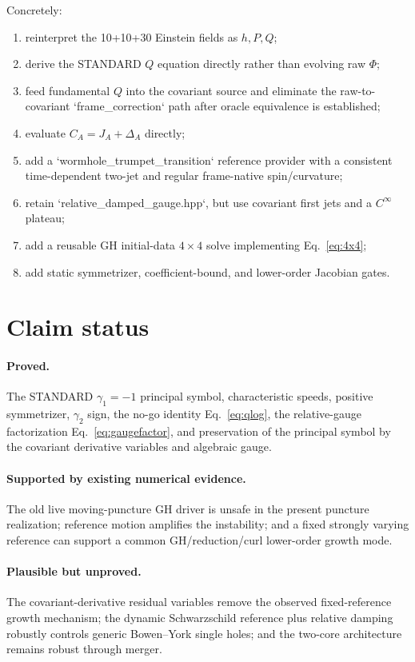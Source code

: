 \documentclass[11pt]{article}
\begin{document}
Concretely:
\begin{enumerate}
\item reinterpret the 10+10+30 Einstein fields as $h,P,Q$;
\item derive the STANDARD $Q$ equation directly rather than evolving raw $\Phi$;
\item feed fundamental $Q$ into the covariant source and eliminate the raw-to-covariant `frame_correction` path after oracle equivalence is established;
\item evaluate $C_A=J_A+\Delta_A$ directly;
\item add a `wormhole_trumpet_transition` reference provider with a consistent time-dependent two-jet and regular frame-native spin/curvature;
\item retain `relative_damped_gauge.hpp`, but use covariant first jets and a $C^\infty$ plateau;
\item add a reusable GH initial-data $4\times4$ solve implementing Eq.~\eqref{eq:4x4};
\item add static symmetrizer, coefficient-bound, and lower-order Jacobian gates.
\end{enumerate}

\section{Claim status}
\paragraph{Proved.}
The STANDARD $\gamma_1=-1$ principal symbol, characteristic speeds, positive symmetrizer, $\gamma_2$ sign, the no-go identity Eq.~\eqref{eq:qlog}, the relative-gauge factorization Eq.~\eqref{eq:gaugefactor}, and preservation of the principal symbol by the covariant derivative variables and algebraic gauge.

\paragraph{Supported by existing numerical evidence.}
The old live moving-puncture GH driver is unsafe in the present puncture realization; reference motion amplifies the instability; and a fixed strongly varying reference can support a common GH/reduction/curl lower-order growth mode.

\paragraph{Plausible but unproved.}
The covariant-derivative residual variables remove the observed fixed-reference growth mechanism; the dynamic Schwarzschild reference plus relative damping robustly controls generic Bowen--York single holes; and the two-core architecture remains robust through merger.
\end{document}
